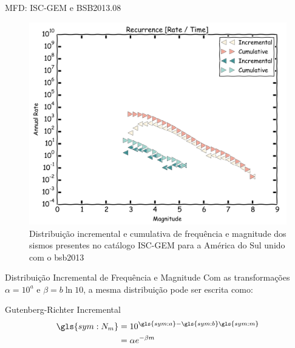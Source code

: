 \documentclass[ucs,8pt]{beamer}
\begin{document}
\begin{frame}{MFD: ISC-GEM e BSB2013.08}
\begin{figure}[H]
   \centering
   \includegraphics[height=0.90\textheight]{occurrence}
   \caption[Distribuição incremental e cumulativa de frequência e magnitude dos sismos presentes no catálogo ISC-GEM
   para a América do Sul unido com o \gls{bsb2013}]
   {Distribuição incremental e cumulativa de frequência e magnitude dos sismos presentes no catálogo ISC-GEM
   para a América do Sul unido com o \gls{bsb2013}} 
   \label{f:occurrence}
\end{figure} 
\end{frame}



\begin{frame}{Distribuição Incremental de Frequência e Magnitude}
Com as transformações $\alpha = 10^a$ e $\beta = b\ln{10}$, a mesma
distribuição pode ser escrita como: \\

	\begin{block}{Gutenberg-Richter Incremental}
		\begin{equation}
			\begin{split}
				\gls{sym:N_m} &= 10^{\gls{sym:a} - \gls{sym:b}\gls{sym:m}} \\
							  &= \alpha e^{-\beta m}
			\end{split}
			\label{eq:gr_exp}
		\end{equation}
	\end{block}

\end{frame}
\end{document}
